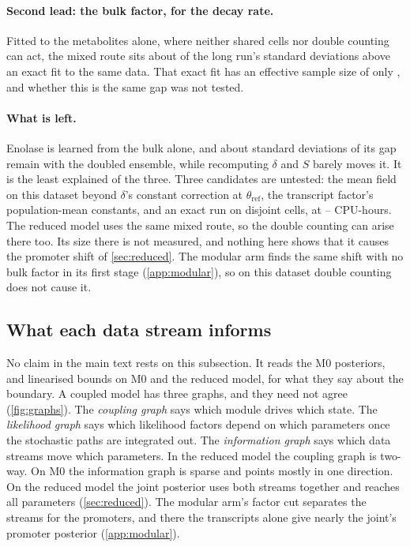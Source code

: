 \paragraph{Second lead: the bulk factor, for the decay rate.} Fitted to the metabolites alone,
where neither shared cells nor double counting can act, the mixed route sits about
 of the long run's standard deviations above an exact fit to the same data.
That exact fit has an effective sample size of only , and whether this is
the same gap was not tested.

\paragraph{What is left.} Enolase is learned from the bulk alone, and about  standard
deviations of its gap remain with the doubled ensemble, while recomputing $\delta$ and $S$
barely moves it. It is the least explained
of the three. Three candidates are untested: the mean field
on this dataset beyond $\delta$'s constant correction at $\theta_{\mathrm{ref}}$, the transcript factor's
population-mean constants, and an exact run on disjoint cells, at
-- CPU-hours. The reduced model uses the same mixed route, so
the double counting can arise there too. Its size there is not measured, and nothing here
shows that it causes the promoter shift of \cref{sec:reduced}. The modular arm finds the same
shift with no bulk factor in its first stage (\cref{app:modular}), so on this dataset double
counting does not cause it.

\subsection{What each data stream informs}
\label{sec:info}

No claim in the main text rests on this subsection. It reads the M0 posteriors, and linearised bounds on M0 and
the reduced model, for what they say about the boundary. A coupled model has three graphs, and they need not agree
(\cref{fig:graphs}). The \emph{coupling graph} says which module drives which
state. The \emph{likelihood graph} says which likelihood factors depend on which
parameters once the stochastic paths are integrated out. The \emph{information
graph} says which data streams move which parameters. In the reduced \syn{} model the
coupling graph is two-way. On M0 the information graph is sparse and points mostly in
one direction. On the reduced model the joint posterior uses both streams together
and reaches all  parameters (\cref{sec:reduced}). The modular arm's factor
cut separates the streams for the promoters, and there the transcripts alone give nearly the
joint's promoter posterior (\cref{app:modular}).

